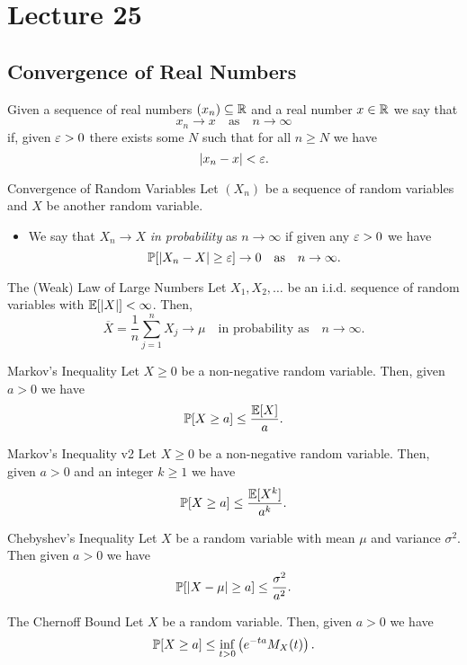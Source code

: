 \documentclass[class=article, crop=false]{standalone}
\begin{document}
  \section{Lecture 25}
  \subsection{Convergence of Real Numbers}
  Given a sequence of real numbers $(x_n)\subseteq\mathbb{R}$ and a real number $x\in \mathbb{R}$ we say that
  \[
    x_n\to x\quad\text{as}\quad n\to\infty
  \]
  if, given $\varepsilon > 0$ there exists some $N$ such that for all $n \geq N$ we have
  \[
    \left\lvert x_n - x \right\rvert < \varepsilon.
  \]
  \begin{definition}{Convergence of Random Variables}
    Let $(X_n)$ be a sequence of random variables and $X$ be another random variable.
    \begin{itemize}
      \item We say that $X_n\to X$ \emph{in probability} as $n\to\infty$ if given any $\varepsilon > 0$ we have 
      \[
        \mathbb{P}[\left\lvert X_n - X \right\rvert \geq \varepsilon] \to 0\quad\text{as}\quad n\to\infty.
      \]
    \end{itemize}
  \end{definition}
  \begin{theorem}{The (Weak) Law of Large Numbers}
    Let $X_1,X_2,\dotsc$ be an i.i.d. sequence of random variables with $\mathbb{E}[\left\lvert X \right\rvert] < \infty$. Then,
    \[
      \overline{X} = \frac{1}{n}\sum_{j=1}^{n} X_j\to \mu\quad\text{in probability as}\quad n\to\infty.
    \]
  \end{theorem}
  \begin{theorem}{Markov's Inequality}
    Let $X \geq 0$ be a non-negative random variable. Then, given $a > 0$ we have
    \[
      \mathbb{P}[X \geq a] \leq \frac{\mathbb{E}[X]}{a}.
    \]
  \end{theorem}
  \begin{theorem}{Markov's Inequality v2}
    Let $X \geq 0$ be a non-negative random variable. Then, given $a > 0$ and an integer $k \geq 1$ we have
    \[
      \mathbb{P}[X \geq a] \leq \frac{\mathbb{E}[X^k]}{a^k}.
    \]
  \end{theorem}
  \begin{theorem}{Chebyshev's Inequality}
    Let $X$ be a random variable with mean $\mu$ and variance $\sigma^2$. Then given $a > 0$ we have
    \[
      \mathbb{P}[\left\lvert X - \mu \right\rvert \geq a] \leq \frac{\sigma^2}{a^2}.
    \]
  \end{theorem}
  \begin{theorem}{The Chernoff Bound}
    Let $X$ be a random variable. Then, given $a > 0$ we have
    \[
      \mathbb{P}[X \geq a] \leq \inf_{t > 0} \left( e^{-ta}M_X(t) \right).
    \]
  \end{theorem}
\end{document}
